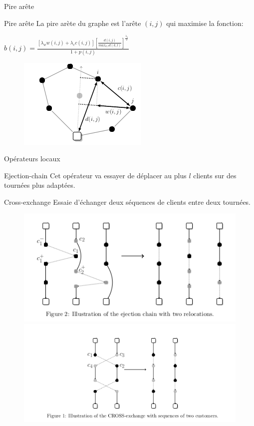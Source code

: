 \documentclass{beamer}
\begin{document}
\begin{frame}{Pire arête}
\begin{exampleblock}{Pire arête}
La pire arète du graphe est l'arête $(i,j)$ qui maximise la fonction:
\begin{center}
$b(i,j) = \frac{[\lambda_w w(i,j) + \lambda_c c(i,j)] [\frac{d(i,j)}{max_{k,l}d(k,l)}] ^ {\frac{\lambda_d}{2}}}{1+p(i,j)}$
\end{center}
\end{exampleblock}

\begin{figure}
\centering
\includegraphics[scale=0.5]{metrics.png}
\end{figure}

\end{frame}

\begin{frame}{Opérateurs locaux}
\begin{block}{Ejection-chain}
Cet opérateur va essayer de déplacer au plus $l$ clients sur des tournées plus adaptées. 
\end{block}
\begin{block}{Cross-exchange}
Essaie d'échanger deux séquences de clients entre deux tournées. 
\end{block}
\begin{figure}
	\centering
	\includegraphics[scale=0.3]{ejection_chain.png}
	\includegraphics[scale=0.3]{cross_exchange.png}
\end{figure}

\end{frame}
\end{document}
